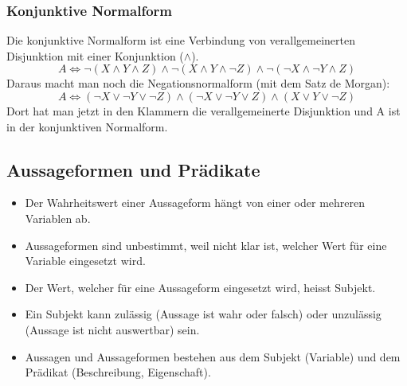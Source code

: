 \subsubsection{Konjunktive Normalform}
  Die konjunktive Normalform ist eine Verbindung von verallgemeinerten Disjunktion
  mit einer Konjunktion ($\wedge$). 
  \[ A \Leftrightarrow \neg(X \wedge Y \wedge Z) \wedge \neg(X \wedge Y \wedge \neg Z) \wedge \neg(\neg X \wedge \neg Y \wedge Z) \]
  Daraus macht man noch die Negationsnormalform (mit dem Satz de Morgan):
  \[ A \Leftrightarrow (\neg X \vee \neg Y \vee \neg Z) \wedge (\neg X \vee \neg Y \vee Z) \wedge (X \vee Y \vee \neg Z) \]
  Dort hat man jetzt in den Klammern die verallgemeinerte Disjunktion und A ist in der konjunktiven Normalform.


\subsection{Aussageformen und Prädikate}
  \begin{itemize}
    \item Der Wahrheitswert einer Aussageform hängt von einer oder mehreren Variablen ab.
    \item Aussageformen sind unbestimmt, weil nicht klar ist, welcher Wert
      für eine Variable eingesetzt wird.
    \item Der Wert, welcher für eine Aussageform eingesetzt wird, heisst Subjekt.
    \item Ein Subjekt kann zulässig (Aussage ist wahr oder falsch) oder unzulässig
      (Aussage ist nicht auswertbar) sein.
    \item Aussagen und Aussageformen bestehen aus dem Subjekt (Variable)
      und dem Prädikat (Beschreibung, Eigenschaft).
  \end{itemize}


